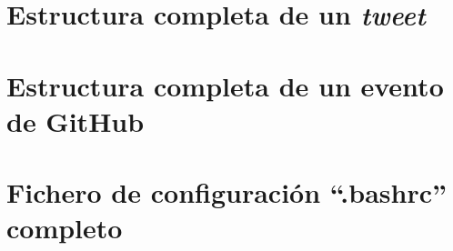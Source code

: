 \chapter{Estructura completa de un \textit{tweet}\label{sc:tweet}}


\cleardoublepage
\chapter{Estructura completa de un evento de GitHub\label{sc:github}}


\cleardoublepage
\chapter{Fichero de configuración ``.bashrc'' completo\label{sc:bashrc}}
